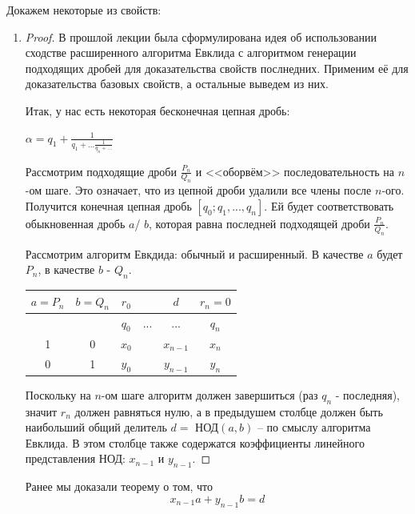 \documentclass[russian]{lecture-notes}
\begin{document}
	Докажем некоторые из свойств:
	\begin{enumerate}
		
		\item \begin{proof}

		В прошлой лекции была сформулирована идея об использовании сходстве расширенного алгоритма Евклида с алгоритмом генерации подходящих дробей для доказательства свойств послнедних. Применим её для доказательства базовых свойств, а остальные выведем из них.
		
		Итак, у нас есть некоторая бесконечная цепная дробь:
		
		$\alpha=q_1+\frac{1}{q_1+...\frac{1}{q_n+...}}$
		
		Рассмотрим подходящие дроби $\frac{P_n}{Q_n}$ и <<оборвём>> последовательность на $ n$-ом шаге. Это означает, что из цепной дроби удалили все члены после $ n$-ого. Получится конечная цепная дробь $[q_0;q_1,...,q_n]$. Ей будет соответствовать обыкновенная дробь $a$/ $b$, которая равна последней подходящей дроби $\frac{P_n}{Q_n}$.
		
		Рассмотрим алгоритм Евкдида: обычный и расширенный. В качестве $a$ будет $P_n$, в качестве $b$ - $Q_n$.
		
		\begin{center}
			\begin{tabular}{|c|c|c|c|c|c|}
				\hline
				$a=P_n$ & $b=Q_n$ & $r_0$ &  & $d$ & $r_n=0$ \\\hline
				&  & $q_0$ & ... & ... & $q_n$ \\\hline
				1 & 0 & $x_0$ &  & $x_{n-1}$ & $x_n$ \\\hline
				0 & 1 & $y_0$ &  & $y_{n-1}$ & $y_n$ \\\hline
			\end{tabular}
		\end{center}
		
		Поскольку на $ n$-ом шаге алгоритм должен завершиться (раз $q_n$ - последняя), значит $r_n$ должен равняться нулю, а в предыдушем столбце должен быть наибольший общий делитель $d =$ НОД$(a, b)$ -- по смыслу алгоритма Евклида. В этом столбце также содержатся коэффициенты линейного представления НОД: $x_{n-1}$ и $y_{n-1}$.
		\end{proof}
	
		Ранее мы доказали теорему о том, что 
		\begin{equation}
			x_{n-1}a + y_{n-1}b = d
		\end{equation}
		

\end{enumerate}
\end{document}
